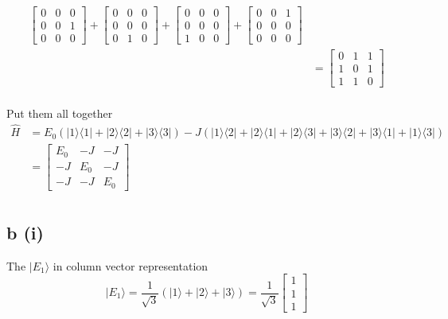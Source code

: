 \documentclass[letter]{article}
\begin{document}
\begin{align*}
	\begin{bmatrix} 0&0&0\\0&0&1\\0&0&0 \end{bmatrix} + 
	\begin{bmatrix} 0&0&0\\0&0&0\\0&1&0 \end{bmatrix} + 
	\begin{bmatrix} 0&0&0\\0&0&0\\1&0&0 \end{bmatrix} + 
	\begin{bmatrix} 0&0&1\\0&0&0\\0&0&0 \end{bmatrix} 
	\\
	&= 
	\begin{bmatrix} 0&1&1\\1&0&1\\1&1&0 \end{bmatrix} 
	\\
\end{align*}

Put them all together 
\begin{align*}
	\hat{H} &= 
	E_0\left(
	| 1 \rangle \langle 1 |  + | 2 \rangle \langle 2 |  + | 3 \rangle \langle 3 | 
	\right) - J
	\left(
	| 1 \rangle \langle 2 | + | 2 \rangle \langle 1  | +
	| 2 \rangle \langle 3 | + | 3 \rangle \langle 2 | + 
	| 3 \rangle \langle 1 | + | 1 \rangle \langle 3 |  
	\right) \\ 
		&= \begin{bmatrix} E_0&-J&-J\\-J&E_0&-J\\-J&-J&E_0 \end{bmatrix}  \\
\end{align*}




\subsection*{b (i)} 
The $| E_1 \rangle $ in column vector representation 
\[
| E_1 \rangle  = \frac{1}{\sqrt{3} } \left(| 1 \rangle + | 2 \rangle + | 3 \rangle \right) = 
	\frac{1}{\sqrt{3} } \begin{bmatrix} 1\\1\\1 \end{bmatrix}  
\]
\end{document}
